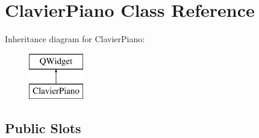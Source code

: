 \section{Clavier\-Piano Class Reference}
\label{class_clavier_piano}
Inheritance diagram for Clavier\-Piano\-:\begin{figure}[H]
\begin{center}
\leavevmode
\includegraphics[height=2.000000cm]{class_clavier_piano}
\end{center}
\end{figure}
\subsection*{Public Slots}
